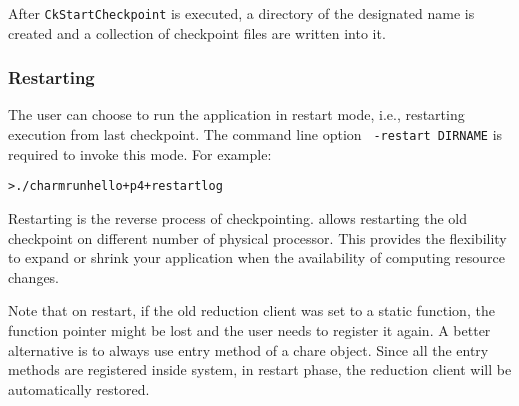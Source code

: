 After {\tt CkStartCheckpoint} is executed, a directory of the designated
name is created and a collection of checkpoint files are written into it. 


\subsubsection{Restarting}

The user can choose to run the \charmpp{} application in restart mode, i.e.,
restarting execution from last checkpoint. The command line option {\tt
-restart DIRNAME} is required to invoke this mode. For example:

\begin{alltt}
  > ./charmrun hello +p4 +restart log
\end{alltt}

Restarting is the reverse process of checkpointing. \charmpp{} allows 
restarting the old checkpoint on different number of physical processor.
This provides the flexibility to expand or shrink your application when
the availability of computing resource changes. 

Note that on restart, if the old reduction client was set to a static 
function, the function pointer might be lost and the user needs to register
it again. A better alternative is to always use entry method of a chare
object. Since all the entry methods are registered inside \charmpp{} system,
in restart phase, the reduction client will be automatically restored.